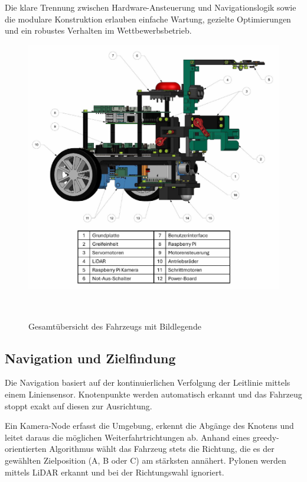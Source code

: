 \documentclass[main.tex]{subfiles} %
\begin{document}
Die klare Trennung zwischen Hardware-Ansteuerung und Navigationslogik sowie die modulare 
Konstruktion erlauben einfache Wartung, gezielte Optimierungen und ein robustes Verhalten 
im Wettbewerbsbetrieb.

\begin{figure}[H]
    \centering
    \includegraphics[width = 1.0\linewidth]{./Figures/Gesamtuebersicht-Fahrzeug.pdf}
    \caption{Gesamtübersicht des Fahrzeugs mit Bildlegende}~\label{fig:Gesamtuebersicht}
\end{figure}

\vspace{1em}

\subsection{Navigation und Zielfindung}

Die Navigation basiert auf der kontinuierlichen Verfolgung der Leitlinie mittels einem 
Liniensensor. Knotenpunkte werden automatisch erkannt und das Fahrzeug stoppt exakt auf 
diesen zur Ausrichtung.

Ein Kamera-Node erfasst die Umgebung, erkennt die Abgänge des Knotens und leitet daraus 
die möglichen Weiterfahrtrichtungen ab. Anhand eines greedy-orientierten Algorithmus wählt 
das Fahrzeug stets die Richtung, die es der gewählten Zielposition (A, B oder C) am 
stärksten annähert. Pylonen werden mittels LiDAR erkannt und bei der Richtungswahl 
ignoriert.
\end{document}

